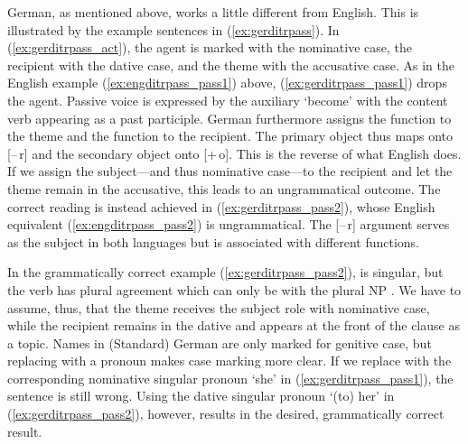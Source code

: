 German, as mentioned above, works a little different from English. This is
illustrated by the example sentences in (\ref{ex:gerditrpass}). In
(\ref{ex:gerditrpass_act}), the agent is marked with the nominative case, the
recipient with the dative case, and the theme with the accusative case. As in
the English example (\ref{ex:engditrpass_pass1}) above,
(\ref{ex:gerditrpass_pass1}) drops the agent. Passive voice is expressed by the
auxiliary  `become' with the content verb appearing as a past
participle. German furthermore assigns the \Obj{} function to the theme and the
\SObj{} function to the recipient. The primary object thus maps onto [–\,r] and
the secondary object onto [+\,o]. This is the reverse of what English does. If
we assign the subject---and thus nominative case---to the recipient and let the
theme remain in the accusative, this leads to an ungrammatical outcome. The
correct reading is instead achieved in (\ref{ex:gerditrpass_pass2}), whose
English equivalent (\ref{ex:engditrpass_pass2}) is ungrammatical. The [–\,r]
argument serves as the subject in both languages but is associated with
different functions.

In the grammatically correct example (\ref{ex:gerditrpass_pass2}),  is
singular, but the verb  has plural agreement which can only be with
the plural NP . We have to assume, thus, that the theme
receives the subject role with nominative case, while the recipient remains in
the dative and appears at the front of the clause as a topic. Names in
(Standard) German are only marked for genitive case, but replacing 
with a pronoun makes case marking more clear. If we replace  with the
corresponding nominative singular pronoun  `she' in
(\ref{ex:gerditrpass_pass1}), the sentence is still wrong. Using the dative
singular pronoun  `(to) her' in (\ref{ex:gerditrpass_pass2}), however,
results in the desired, grammatically correct result.

